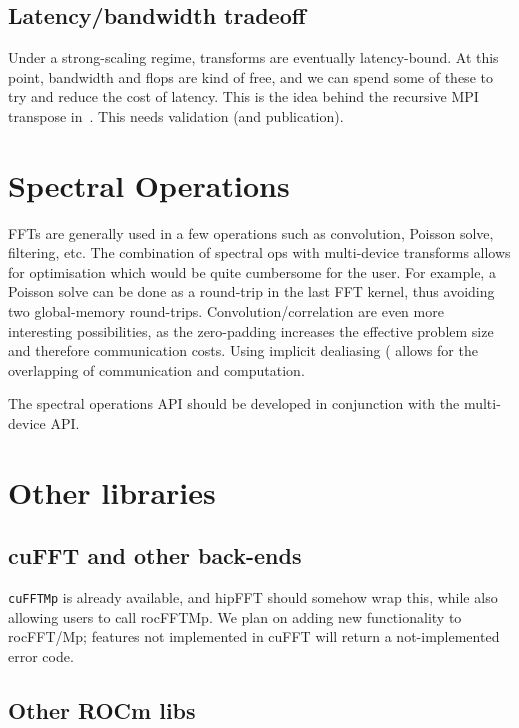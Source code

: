 \documentclass[12pt]{article}
\renewcommand{\(}{\left(}
\renewcommand{\)}{\right)}
\begin{document}
\subsection{Latency/bandwidth tradeoff}

Under a strong-scaling regime, transforms are eventually
latency-bound.  At this point, bandwidth and flops are kind of free,
and we can spend some of these to try and reduce the cost of latency.
This is the idea behind the recursive MPI transpose
in~\cite{bowmanroberts2015adaptive}.  This needs validation (and
publication).


\section{Spectral Operations}
\label{spectralops}

FFTs are generally used in a few operations such as convolution,
Poisson solve, filtering, etc.  The combination of spectral ops with
multi-device transforms allows for optimisation which would be quite
cumbersome for the user.  For example, a Poisson solve can be done as
a round-trip in the last FFT kernel, thus avoiding two global-memory
round-trips.  Convolution/correlation are even more interesting
possibilities, as the zero-padding increases the effective problem
size and therefore communication costs.  Using implicit dealiasing
(\cite{dealias2} allows for the overlapping of communication and
computation.

The spectral operations API should be developed in conjunction
with the multi-device API.

\section{Other libraries}

\subsection{cuFFT and other back-ends}

\texttt{cuFFTMp} is already available, and hipFFT should somehow wrap
this, while also allowing users to call rocFFTMp.  We plan on adding
new functionality to rocFFT/Mp; features not implemented in cuFFT will
return a not-implemented error code.


\subsection{Other ROCm libs}
\end{document}
